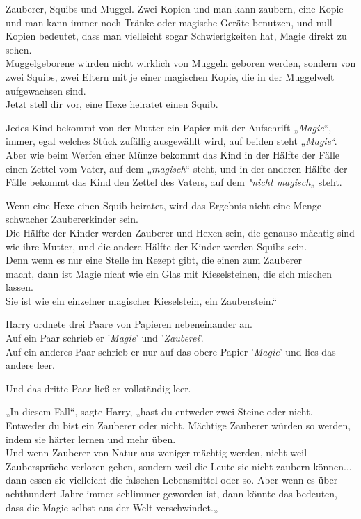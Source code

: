 {Zauberer, Squibs und Muggel. Zwei Kopien und man kann zaubern, eine Kopie und man kann immer noch Tränke oder magische Geräte benutzen, und null Kopien bedeutet, dass man vielleicht sogar Schwierigkeiten hat, Magie direkt zu sehen.\\ Muggelgeborene würden nicht wirklich von Muggeln geboren werden, sondern von zwei Squibs, zwei Eltern mit je einer magischen Kopie, die in der Muggelwelt aufgewachsen sind.\\ Jetzt stell dir vor, eine Hexe heiratet einen Squib.

Jedes Kind bekommt von der Mutter ein Papier mit der Aufschrift „\emph{Magie}“, immer, egal welches Stück zufällig ausgewählt wird, auf beiden steht „\emph{Magie}“.\\ Aber wie beim Werfen einer Münze bekommt das Kind in der Hälfte der Fälle einen Zettel vom Vater, auf dem „\emph{magisch}“ steht, und in der anderen Hälfte der Fälle bekommt das Kind den Zettel des Vaters, auf dem \emph{"nicht magisch„} steht.

Wenn eine Hexe einen Squib heiratet, wird das Ergebnis nicht eine Menge schwacher Zaubererkinder sein.\\ Die Hälfte der Kinder werden Zauberer und Hexen sein, die genauso mächtig sind wie ihre Mutter, und die andere Hälfte der Kinder werden Squibs sein.\\ Denn wenn es nur eine Stelle im Rezept gibt, die einen zum Zauberer\\ macht, dann ist Magie nicht wie ein Glas mit Kieselsteinen, die sich mischen lassen.\\ Sie ist wie ein einzelner magischer Kieselstein, ein Zauberstein.“

Harry ordnete drei Paare von Papieren nebeneinander an.\\ Auf ein Paar schrieb er '\emph{Magie}' und '\emph{Zauberei}'.\\ Auf ein anderes Paar schrieb er nur auf das obere Papier '\emph{Magie}' und lies das andere leer.

Und das dritte Paar ließ er vollständig leer.

„In diesem Fall“, sagte Harry, „hast du entweder zwei Steine oder nicht.\\ Entweder du bist ein Zauberer oder nicht. Mächtige Zauberer würden so werden, indem sie härter lernen und mehr üben.\\ Und wenn Zauberer von Natur aus weniger mächtig werden, nicht weil Zaubersprüche verloren gehen, sondern weil die Leute sie nicht zaubern können... dann essen sie vielleicht die falschen Lebensmittel oder so. Aber wenn es über achthundert Jahre immer schlimmer geworden ist, dann könnte das bedeuten, dass die Magie selbst aus der Welt verschwindet.„

}
